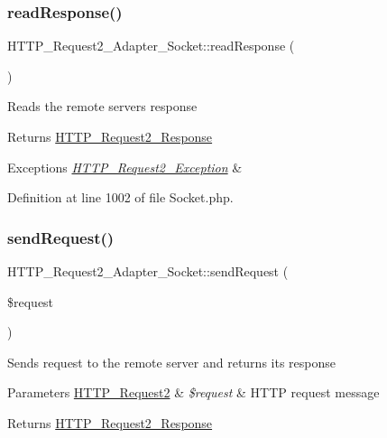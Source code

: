 \subsubsection{\texorpdfstring{read\+Response()}{readResponse()}}
{\footnotesize\ttfamily H\+T\+T\+P\+\_\+\+Request2\+\_\+\+Adapter\+\_\+\+Socket\+::read\+Response (\begin{DoxyParamCaption}{ }\end{DoxyParamCaption})\hspace{0.3cm}{\ttfamily [protected]}}

Reads the remote server\textquotesingle{}s response

\begin{DoxyReturn}{Returns}
\hyperlink{classHTTP__Request2__Response}{H\+T\+T\+P\+\_\+\+Request2\+\_\+\+Response} 
\end{DoxyReturn}

\begin{DoxyExceptions}{Exceptions}
{\em \hyperlink{classHTTP__Request2__Exception}{H\+T\+T\+P\+\_\+\+Request2\+\_\+\+Exception}} & \\
\hline
\end{DoxyExceptions}


Definition at line 1002 of file Socket.\+php.

\hypertarget{classHTTP__Request2__Adapter__Socket_ac601f7f165d0771e38f680a1f159fe79}{}\label{classHTTP__Request2__Adapter__Socket_ac601f7f165d0771e38f680a1f159fe79} 
\subsubsection{\texorpdfstring{send\+Request()}{sendRequest()}}
{\footnotesize\ttfamily H\+T\+T\+P\+\_\+\+Request2\+\_\+\+Adapter\+\_\+\+Socket\+::send\+Request (\begin{DoxyParamCaption}\item[{\hyperlink{classHTTP__Request2}{H\+T\+T\+P\+\_\+\+Request2}}]{\$request }\end{DoxyParamCaption})}

Sends request to the remote server and returns its response


\begin{DoxyParams}[1]{Parameters}
\hyperlink{classHTTP__Request2}{H\+T\+T\+P\+\_\+\+Request2} & {\em \$request} & H\+T\+TP request message\\
\hline
\end{DoxyParams}
\begin{DoxyReturn}{Returns}
\hyperlink{classHTTP__Request2__Response}{H\+T\+T\+P\+\_\+\+Request2\+\_\+\+Response} 
\end{DoxyReturn}

